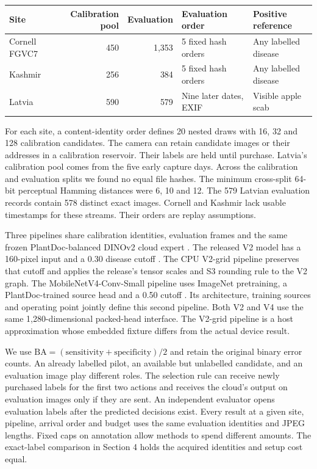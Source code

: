 \begin{center}\small
\begin{tabular}{@{}lrrll@{}}\toprule
Site & Calibration pool & Evaluation & Evaluation order & Positive reference\\\midrule
Cornell FGVC7 \cite{thapa} &450&1,353&5 fixed hash orders&Any labelled disease\\
Kashmir \cite{yatoo} &256&384&5 fixed hash orders&Any labelled disease\\
Latvia \cite{kodors} &590&579&Nine later dates, EXIF&Visible apple scab\\\bottomrule
\end{tabular}
\end{center}
For each site, a content-identity order defines 20 nested draws with 16, 32 and 128 calibration candidates. The camera can retain candidate images or their addresses in a calibration reservoir. Their labels are held until purchase. Latvia's calibration pool comes from the five early capture days. Across the calibration and evaluation splits we found no equal file hashes. The minimum cross-split 64-bit perceptual Hamming distances were 6, 10 and 12. The 579 Latvian evaluation records contain 578 distinct exact images. Cornell and Kashmir lack usable timestamps for these streams. Their orders are replay assumptions.

Three pipelines share calibration identities, evaluation frames and the same frozen PlantDoc-balanced DINOv2 cloud expert \cite{dino}. The released V2 model has a 160-pixel input and a 0.30 disease cutoff \cite{agri}. The CPU V2-grid pipeline preserves that cutoff and applies the release's tensor scales and S3 rounding rule to the V2 graph. The MobileNetV4-Conv-Small pipeline uses ImageNet pretraining, a PlantDoc-trained source head and a 0.50 cutoff \cite{vfour}. Its architecture, training sources and operating point jointly define this second pipeline. Both V2 and V4 use the same 1,280-dimensional packed-head interface. The V2-grid pipeline is a host approximation whose embedded fixture differs from the actual device result.

We use $\mathrm{BA}=(\mathrm{sensitivity}+\mathrm{specificity})/2$ and retain the original binary error counts. An already labelled pilot, an available but unlabelled candidate, and an evaluation image play different roles. The selection rule can receive newly purchased labels for the first two actions and receives the cloud's output on evaluation images only if they are sent. An independent evaluator opens evaluation labels after the predicted decisions exist. Every result at a given site, pipeline, arrival order and budget uses the same evaluation identities and JPEG lengths. Fixed caps on annotation allow methods to spend different amounts. The exact-label comparison in Section 4 holds the acquired identities and setup cost equal.

